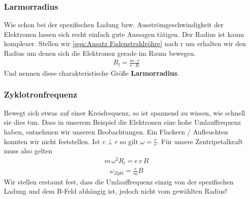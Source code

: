 \subsubsection{Larmorradius}
Wie schon bei der spezifischen Ladung bzw. Ausströmgeschwindigkeit der Elektronen lassen sich recht einfach gute Aussagen tätigen.  Der Radius ist kaum komplexer. 
Stellen wir \ref{eqn:Ansatz Fadenstrahlröhre} nach r um erhalten wir den Radius um denen sich die Elektronen gerade im Raum bewegen.
\begin{align} \label{eqn:Larmorradius}
\boxed{R_l = \frac{m \cdot v}{e \cdot B}}
\end{align} Und nennen diese charakteristische Größe \textbf{Larmorradius}. 

\subsubsection{Zyklotronfrequenz}
Bewegt sich etwas auf einer Kreisfrequenz, so ist spannend zu wissen, wie schnell sie dies tun. Dass in unserem Beispiel die Elektronen eine hohe Umlauffrequenz haben, entnehmen wir unseren Beobachtungen. Ein Flackern / Aufleuchten konnten wir nicht feststellen. 
Ist $v \perp r$ so gilt $\omega = \frac{v}{r}$. Für unsere Zentripetalkraft muss also gelten
\begin{align*}
m \, \omega^2 R_l = e \, v \, B
\end{align*}
\begin{align} \label{eqn:Zyklotronfrequenz}
\boxed{\omega_{Zykl} = \frac{e}{m} B}
\end{align}Wir stellen erstaunt fest, dass die Umlauffrequenz einzig von der spezifischen Ladung und dem B-Feld abhängig ist, jedoch nicht vom gewählten Radius!

